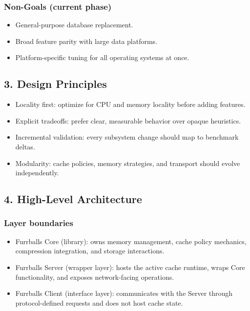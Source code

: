 \documentclass[
  english,
  letterpaper,
  DIV=11,
  numbers=noendperiod]{scrartcl}
\providecommand{\tightlist}{%
  \setlength{\itemsep}{0pt}\setlength{\parskip}{0pt}}
\begin{document}
\subsubsection{Non-Goals (current phase)}\label{non-goals-current-phase}

\begin{itemize}
\tightlist
\item
  General-purpose database replacement.
\item
  Broad feature parity with large data platforms.
\item
  Platform-specific tuning for all operating systems at once.
\end{itemize}

\subsection{3. Design Principles}\label{design-principles}

\begin{itemize}
\tightlist
\item
  Locality first: optimize for CPU and memory locality before adding
  features.
\item
  Explicit tradeoffs: prefer clear, measurable behavior over opaque
  heuristics.
\item
  Incremental validation: every subsystem change should map to benchmark
  deltas.
\item
  Modularity: cache policies, memory strategies, and transport should
  evolve independently.
\end{itemize}

\subsection{4. High-Level Architecture}\label{high-level-architecture}

\subsubsection{Layer boundaries}\label{layer-boundaries}

\begin{itemize}
\tightlist
\item
  Furrballs Core (library): owns memory management, cache policy
  mechanics, compression integration, and storage interactions.
\item
  Furrballs Server (wrapper layer): hosts the active cache runtime,
  wraps Core functionality, and exposes network-facing operations.
\item
  Furrballs Client (interface layer): communicates with the Server
  through protocol-defined requests and does not host cache state.
\end{itemize}
\end{document}
